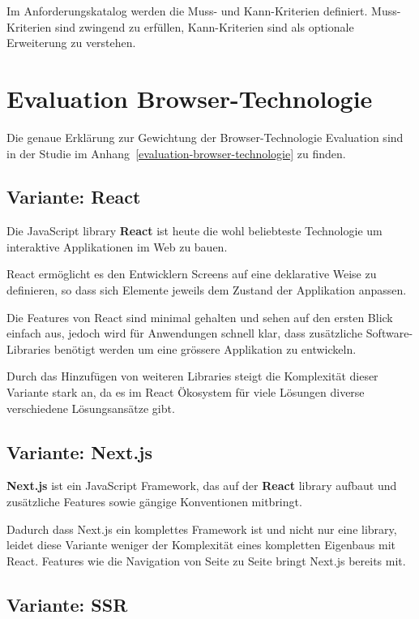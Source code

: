Im Anforderungskatalog werden die Muss- und Kann-Kriterien definiert.
Muss-Kriterien sind zwingend zu erfüllen, Kann-Kriterien sind als optionale
Erweiterung zu verstehen.



\clearpage
\section{Evaluation Browser-Technologie}

\noindent{}Die genaue Erklärung zur Gewichtung der Browser-Technologie
Evaluation sind in der Studie im Anhang~\ref{evaluation-browser-technologie}
zu finden.

\subsection{Variante: React}

Die JavaScript \Gls{library} \textbf{React} ist heute die wohl beliebteste
Technologie um interaktive Applikationen im Web zu bauen.

React ermöglicht es den Entwicklern Screens auf eine deklarative Weise zu
definieren, so dass sich Elemente jeweils dem Zustand der Applikation anpassen.

Die Features von React sind minimal gehalten und sehen auf den ersten Blick
einfach aus, jedoch wird für Anwendungen schnell klar, dass zusätzliche
Software-Libraries benötigt werden um eine grössere Applikation zu entwickeln.

Durch das Hinzufügen von weiteren Libraries steigt die Komplexität dieser
Variante stark an, da es im React Ökosystem für viele Lösungen diverse
verschiedene Lösungsansätze gibt.

\subsection{Variante: Next.js}

\textbf{Next.js} ist ein JavaScript Framework, das auf der \textbf{React}
\Gls{library} aufbaut und zusätzliche Features sowie gängige Konventionen mitbringt.

Dadurch dass Next.js ein komplettes Framework ist und nicht nur eine \Gls{library},
leidet diese Variante weniger der Komplexität eines kompletten Eigenbaus mit
React. Features wie die Navigation von Seite zu Seite bringt Next.js bereits
mit.

\subsection{Variante: SSR}

